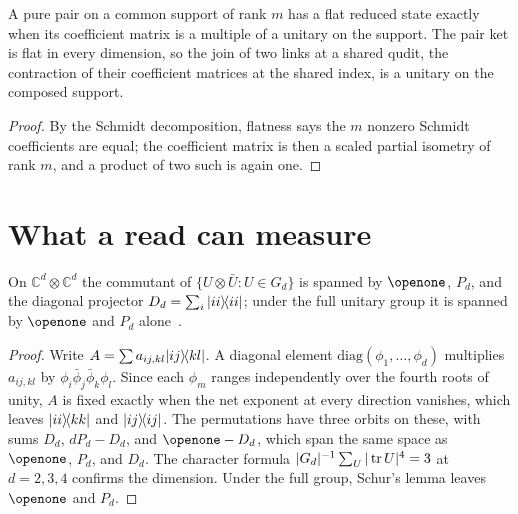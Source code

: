 \begin{lemma}
\label{lem:s-join}
A pure pair on a common support of rank $m$ has a flat reduced state exactly when its coefficient matrix is a multiple of a unitary on the support. The pair ket is flat in every dimension, so the join of two links at a shared qudit, the contraction of their coefficient matrices at the shared index, is a unitary on the composed support.
\end{lemma}
\begin{proof}
By the Schmidt decomposition, flatness says the $m$ nonzero Schmidt coefficients are equal; the coefficient matrix is then a scaled partial isometry of rank $m$, and a product of two such is again one.
\end{proof}

\section{What a read can measure}
\label{sec:s-read}

\begin{lemma}
\label{lem:s-commutant}
On $\mathbb{C}^{d}\otimes\mathbb{C}^{d}$ the commutant of $\{U\otimes\bar{U}:U\in G_{d}\}$ is spanned by $\openone$, $P_{d}$, and the diagonal projector $D_{d}=\sum_{i}|ii\rangle\!\langle ii|$; under the full unitary group it is spanned by $\openone$ and $P_{d}$ alone~\cite{horodecki1999}.
\end{lemma}
\begin{proof}
Write $A=\sum a_{ij,kl}|ij\rangle\!\langle kl|$. A diagonal element $\mathrm{diag}(\phi_{1},\ldots,\phi_{d})$ multiplies $a_{ij,kl}$ by $\phi_{i}\bar{\phi}_{j}\bar{\phi}_{k}\phi_{l}$. Since each $\phi_{m}$ ranges independently over the fourth roots of unity, $A$ is fixed exactly when the net exponent at every direction vanishes, which leaves $|ii\rangle\!\langle kk|$ and $|ij\rangle\!\langle ij|$. The permutations have three orbits on these, with sums $D_{d}$, $dP_{d}-D_{d}$, and $\openone-D_{d}$, which span the same space as $\openone$, $P_{d}$, and $D_{d}$. The character formula $|G_{d}|^{-1}\sum_{U}|\operatorname{tr} U|^{4}=3$ at $d=2,3,4$ confirms the dimension. Under the full group, Schur's lemma leaves $\openone$ and $P_{d}$.
\end{proof}

